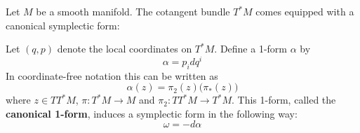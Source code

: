 	\begin{construct}
		Let $M$ be a smooth manifold. The cotangent bundle $T^*M$ comes equipped with a canonical symplectic form:
		
		Let $(q, p)$ denote the local coordinates on $T^*M$. Define a 1-form $\alpha$ by \[\alpha = p_idq^i\] In coordinate-free notation this can be written as
		\begin{equation}
			\alpha(z) = \pi_2(z)\Big(\pi_*(z)\Big)
		\end{equation}
		where $z\in TT^*M$, $\pi: T^*M\rightarrow M$ and $\pi_2:TT^*M\rightarrow T^*M$. This 1-form, called the \textbf{canonical 1-form}, induces a symplectic form in the following way: \[\omega = -d\alpha\] 
	\end{construct}
